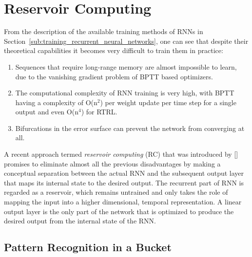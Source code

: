 \section{Reservoir Computing}
\label{sec:reservoir_computing}

From the description of the available training methods of RNNs in
Section~\ref{sub:training_recurrent_neural_networks}, one can see that despite
their theoretical capabilities it becomes very difficult to train them in
practice:
\begin{enumerate}
  \item Sequences that require long-range memory are almost impossible to learn,
    due to the vanishing gradient problem of BPTT based optimizers.
  \item The computational complexity of RNN training is very high, with BPTT
    having a complexity of O(n$^2$) per weight update per time step for a
    single output and even O(n$^4$) for RTRL.
  \item Bifurcations in the error surface can prevent the network from
    converging at all.
\end{enumerate}

A recent approach termed \emph{reservoir computing} (RC) that was introduced by
[\cite{lukosevicius}] promises to eliminate almost all the previous
disadvantages by making a conceptual separation between the actual RNN and the
subsequent output layer that maps its internal state to the desired output.
The recurrent part of RNN is regarded as a reservoir, which remains untrained
and only takes the role of mapping the input into a higher dimensional,
temporal representation.  A linear output layer is the only part of the network
that is optimized to produce the desired output from the internal state of the
RNN.

\subsection{Pattern Recognition in a Bucket}%
\label{sub:pattern_recognition_in_a_bucket}

